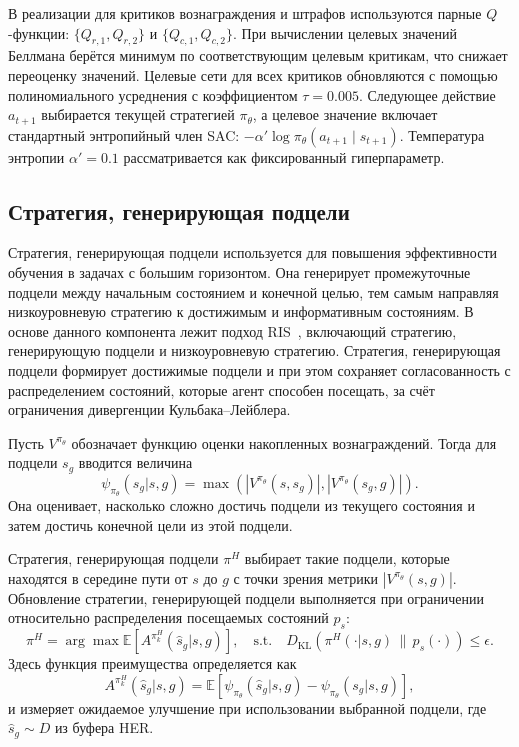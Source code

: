 В реализации для критиков вознаграждения и штрафов используются парные $Q$-функции: $\{Q_{r,1}, Q_{r,2}\}$ и $\{Q_{c,1}, Q_{c,2}\}$. При вычислении целевых значений Беллмана берётся минимум по соответствующим целевым критикам, что снижает переоценку значений. Целевые сети для всех критиков обновляются с помощью полиномиального усреднения с коэффициентом $\tau = 0.005$. Следующее действие $a_{t+1}$ выбирается текущей стратегией $\pi_\theta$, а целевое значение включает стандартный энтропийный член SAC: $-\alpha' \log \pi_\theta(a_{t+1}\mid s_{t+1})$. Температура энтропии $\alpha' = 0.1$ рассматривается как фиксированный гиперпараметр.

\subsection{Стратегия, генерирующая подцели}
\label{subsec:sgsafe_subgoal_policy}

Стратегия, генерирующая подцели используется для повышения эффективности обучения в задачах с большим горизонтом. Она генерирует промежуточные подцели между начальным состоянием и конечной целью, тем самым направляя низкоуровневую стратегию к достижимым и информативным состояниям. В основе данного компонента лежит подход RIS~\cite{chane2021goal}, включающий стратегию, генерирующую подцели и низкоуровневую стратегию. Стратегия, генерирующая подцели формирует достижимые подцели и при этом сохраняет согласованность с распределением состояний, которые агент способен посещать, за счёт ограничения дивергенции Кульбака--Лейблера.

Пусть $V^{\pi_\theta}$ обозначает функцию оценки накопленных вознаграждений. Тогда для подцели $s_g$ вводится величина
\begin{equation}
\psi_{\pi_\theta}(s_g|s,g)
    =
    \max\left(
\left|V^{\pi_\theta}(s,s_g)\right|,
\left|V^{\pi_\theta}(s_g,g)\right|
    \right).
\end{equation}
Она оценивает, насколько сложно достичь подцели из текущего состояния и затем достичь конечной цели из этой подцели.

Стратегия, генерирующая подцели $\pi^H$ выбирает такие подцели, которые находятся в середине пути от $s$ до $g$ с точки зрения метрики $|V^{\pi_\theta}(s,g)|$.
Обновление стратегии, генерирующей подцели выполняется при ограничении относительно распределения посещаемых состояний $p_s$:
\begin{equation}
\label{eq:sgsafe_subgoal_policy_improvement}
\pi^H
=
\arg\max
\mathbb{E}
\left[
A^{\pi^H_k}(\hat{s}_g|s,g)
\right],
\quad
\text{s.t.}
\quad
D_{\mathrm{KL}}
\left(
\pi^H(\cdot|s,g)\,\|\,p_s(\cdot)
\right)
\leq \epsilon.
\end{equation}
Здесь функция преимущества определяется как
\begin{equation}
A^{\pi^H_k}(\hat{s}_g|s,g)
=
\mathbb{E}
\left[
\psi_{\pi_\theta}(\hat{s}_g|s,g)
-
\psi_{\pi_\theta}(s_g|s,g)
\right],
\end{equation}
и измеряет ожидаемое улучшение при использовании выбранной подцели, где $\hat{s}_g \sim D$ из буфера HER.

